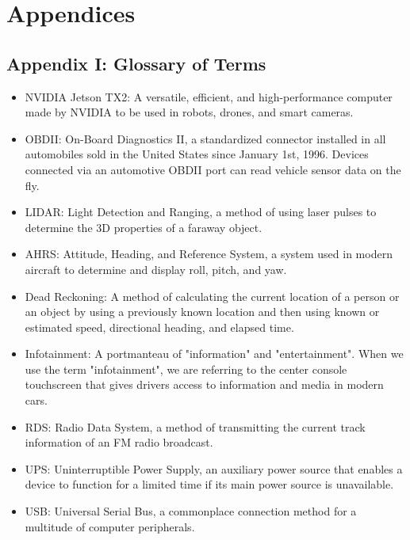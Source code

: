 \documentclass[onecolumn, draftclsnofoot,10pt, compsoc]{IEEEtran}
\begin{document}
\section{Appendices}
\subsection{Appendix I: Glossary of Terms}
\begin{itemize}
	\item NVIDIA Jetson TX2: A versatile, efficient, and high-performance computer made by NVIDIA to be used in robots, drones, and smart cameras.

	\item OBDII: On-Board Diagnostics II, a standardized connector installed in all automobiles sold in the United States since January 1st, 1996. Devices connected via an automotive OBDII port can read vehicle sensor data on the fly.

	\item LIDAR: Light Detection and Ranging, a method of using laser pulses to determine the 3D properties of a faraway object.

	\item AHRS: Attitude, Heading, and Reference System, a system used in modern aircraft to determine and display roll, pitch, and yaw.

	\item Dead Reckoning: A method of calculating the current location of a person or an object by using a previously known location and then using known or estimated speed, directional heading, and elapsed time.

	\item Infotainment: A portmanteau of "information" and "entertainment". When we use the term "infotainment", we are referring to the center console touchscreen that gives drivers access to information and media in modern cars.

	\item RDS: Radio Data System, a method of transmitting the current track information of an FM radio broadcast.

	\item UPS: Uninterruptible Power Supply, an auxiliary power source that enables a device to function for a limited time if its main power source is unavailable.
	
	\item USB: Universal Serial Bus, a commonplace connection method for a multitude of computer peripherals.
	

\end{itemize}
\end{document}
